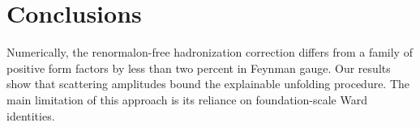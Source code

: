 \section{Conclusions}\label{sec:conclusions}

Numerically, the renormalon-free hadronization correction differs from a
family of positive form factors by less than two percent in Feynman
gauge. Our results show that scattering amplitudes bound the explainable
unfolding procedure. The main limitation of this approach is its
reliance on foundation-scale Ward identities.

